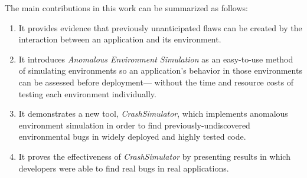 
The main contributions in this work can be summarized as follows:

\begin{enumerate}

\item{It provides evidence
that previously unanticipated flaws can be created by the interaction
between an application and its environment.}

\item{It introduces \textit{Anomalous Environment Simulation}
as an easy-to-use method of simulating environments
so an application's behavior in those environments
can be assessed before deployment---
without the time and resource costs of
testing each environment individually.}

\item{It demonstrates a new tool, {\em CrashSimulator},
which implements anomalous environment simulation
in order to find previously-undiscovered environmental bugs
in widely deployed and highly tested code.}

\item{It proves the effectiveness
of {\em CrashSimulator}
by presenting results
in which developers
were able to find real bugs in real applications.}

\end{enumerate}
